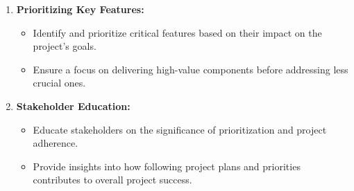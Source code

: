 \documentclass[12pt]{article}
\begin{document}
\begin{enumerate}
                  \item  \textbf{Prioritizing Key Features:}
              \begin{itemize}
                    \item Identify and prioritize critical features based on their impact on the project's goals.
                    \item Ensure a focus on delivering high-value components before addressing less crucial ones.
                \end{itemize}

            \item  \textbf{Stakeholder Education:}
              \begin{itemize}
                    \item Educate stakeholders on the significance of prioritization and project adherence.
                    \item Provide insights into how following project plans and priorities contributes to overall project success.
                \end{itemize}
                
    \end{enumerate}
\end{document}
